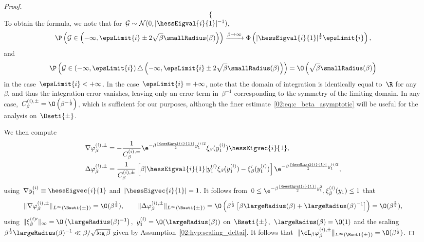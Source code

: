 \begin{proof}
\begin{equation}
\begin{cases}
            \end{cases}
        \end{equation}
            To obtain the formula, we note that for~$\mathcal G\sim\mathcal N(0,|\hessEigval{i}{1}|^{-1})$,
            \begin{equation}
                \label{02:eq:c_beta_integral_asympt}
            \P\left(\mathcal G\in \left(-\infty,\epsLimit{i}\pm2\sqrt\beta\smallRadius(\beta)\right)\right) \xrightarrow{\beta\to\infty} \Phi\left(|\hessEigval{i}{1}|^{\frac12}\epsLimit{i}\right),
            \end{equation}
            and
            \begin{equation}
                \label{02:eq:c_beta_integral_error}
                \P\left(\mathcal G\in\left(-\infty,\epsLimit{i}\right)\triangle\left(-\infty,\epsLimit{i}\pm2\sqrt\beta\smallRadius(\beta)\right)\right) = \O\left(\sqrt\beta\smallRadius(\beta)\right)
            \end{equation}
            in the case~$\epsLimit{i}<+\infty$.
            In the case~$\epsLimit{i}=+\infty$, note that the domain of integration is identically equal to~$\R$ for any~$\beta$, and thus the integration error vanishes, leaving only an error term in~$\beta^{-1}$ corresponding to the symmetry of the limiting domain.
            In any case,~$C_\beta^{(i),\pm} = \O\left(\beta^{-\frac12}\right)$, which is sufficient for our purposes, although the finer estimate~\eqref{02:eq:c_beta_asymptotic} will be useful for the analysis on~$\Dseti{\pm}$.

            We then compute
            \begin{equation}
                \label{02:eq:local_derivatives}
            \begin{split}
                \nabla\varphi_\beta^{(i),\pm} & = -\frac1{C_\beta^{(i),\pm}}\e^{-\beta\frac{|\hessEigval{i}{1}|}{2}y_1^{(i)2}}\xi_\beta(y_1^{(i)})\hessEigvec{i}{1},\\
                \Delta\varphi_\beta^{(i),\pm} & =\frac1{C_\beta^{(i),\pm}}\left[\beta |\hessEigval{i}{1}|y_1^{(i)}\xi_\beta(y_1^{(i)}) -\xi_\beta'(y_1^{(i)})\right]\e^{-\beta\frac{|\hessEigval{i}{1}|}{2}y_1^{(i)2}},
            \end{split}
            \end{equation}
            using~$\nabla y_1^{(i)} \equiv \hessEigvec{i}{1}$ and~$|\hessEigvec{i}{1}|=1$.
            It follows from~$0\leq \e^{-\beta\frac{|\hessEigval{i}{1}|}{2}y_1^2},\xi_\beta^{(i)}(y_1)\leq 1$ that
            \[\|\nabla \varphi_\beta^{(i),\pm}\|_{L^\infty(\Bseti{\pm})} = \O(\beta^{\frac12}),\qquad\|\Delta \varphi_\beta^{(i),\pm}\|_{L^\infty(\Bseti{\pm})} =\O\left(\beta^{\frac12}\left[\beta\largeRadius(\beta)+\largeRadius(\beta)^{-1}\right]\right)=\O(\beta^{\frac32}),\]
            using~$\|\xi^{(i)\prime}_\beta\|_{\infty} = \O\left(\largeRadius(\beta)^{-1}\right)$,~$y_1^{(i)}=\O(\largeRadius(\beta))$ on~$\Bseti{\pm}$,~$\largeRadius(\beta)=\O(1)$ and the scaling~$\beta^{\frac12}\largeRadius(\beta)^{-1}\ll \beta/\sqrt{\log\beta}$ given by Assumption~\eqref{02:hyp:scaling_deltai}.
            It follows that~$\|\cL_\beta \varphi_\beta^{(i),\pm}\|_{L^\infty(\Bseti{\pm})}=\O(\beta^{\frac12})$.
            

\end{proof}
